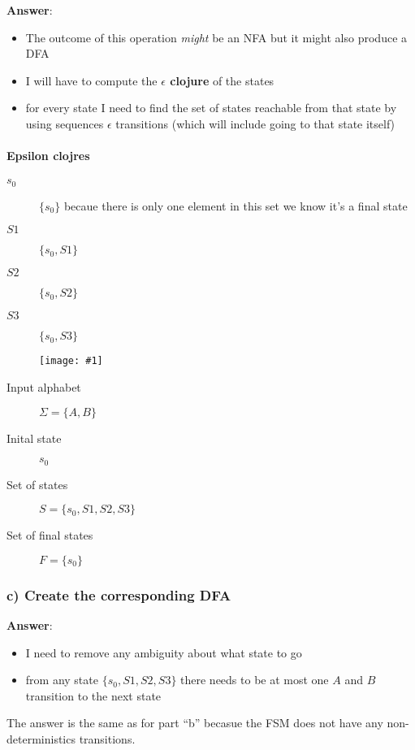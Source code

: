 \documentclass[a4paper, 14pt]{report}
\newcommand{\centeredimg}[1]{%
	\begin{figure}[h]
		\begin{center}
			\texttt{[image: \#1]}
		\end{center}
\end{figure}}
\newcommand{\answer}[1]{%
	\begin{flushleft}
		\textbf{Answer}:\\
			#1
	\end{flushleft}}
\begin{document}
\answer{%

	\begin{itemize}		
		\item The outcome of this operation \textit{might} be an NFA but it might also produce a DFA
		\item I will have to compute the \textbf{$\epsilon$ clojure} of the
			states
		\item for every state I need to find the set of states reachable from
			that state by using sequences $\epsilon$ transitions (which will include going to that state itself)
	\end{itemize}

	\pagebreak

	\paragraph{Epsilon clojres}
		
	\begin{description}
	  \item [$s_0$] $\{s_0\}$ becaue there is only one element in this set we know it's a final state
	  \item [$S1$] $\{s_0, S1\}$
	  \item [$S2$] $\{s_0, S2\}$
	  \item [$S3$] $\{s_0, S3\}$
	\end{description}

	\centeredimg{rl_1_b.jpg}
	\hline
	\begin{description}
		\item [Input alphabet] $\Sigma = \{A, B\}$
		\item [Inital state] $s_0$
		\item [Set of states] $S = \{s_0, S1, S2, S3\}$
		\item [Set of final states] $F = \{s_0\}$
	\end{description}
	\hline
} 

\subsubsection*{c) Create the corresponding DFA}

\answer{%

	\begin{itemize}		
		\item I need to remove any ambiguity about what state to go 
		\item from any state $\{s_0, S1, S2, S3\}$ there needs to be at most one $A$ and $B$
			transition to the next state
	\end{itemize}		

	The answer is the same as for part ``b'' becasue the FSM does not
	have any non-deterministics transitions.
}
\end{document}

